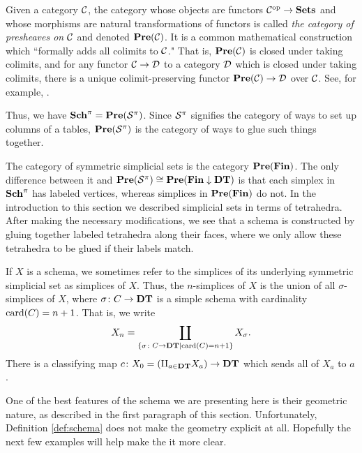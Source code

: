 \documentclass{amsart}
\begin{document}
\begin{remark}\label{rem:sch and fin}

Given a category $\mathcal{C}$, the category whose objects are functors $\mathcal{C}^\textnormal{op}\rightarrow{\bf Sets}$ and whose morphisms are natural transformations of functors is called {\em the category of presheaves on $\mathcal{C}$} and denoted ${\bf Pre}(\mathcal{C})$.  It is a common mathematical construction which ``formally adds all colimits to $\mathcal{C}$."  That is, ${\bf Pre}(\mathcal{C})$ is closed under taking colimits, and for any functor $\mathcal{C}\rightarrow\mathcal{D}$ to a category $\mathcal{D}$ which is closed under taking colimits, there is a unique colimit-preserving functor ${\bf Pre}(\mathcal{C})\rightarrow\mathcal{D}$ over $\mathcal{C}$.  See, for example, \cite[I.5.4]{MM}.

Thus, we have ${\bf Sch}^\pi={\bf Pre}(\mathcal{S}^\pi)$.  Since $\mathcal{S}^\pi$ signifies the category of ways to set up columns of a tables, ${\bf Pre}(\mathcal{S}^\pi)$ is the category of ways to glue such things together.

\end{remark}

\begin{remark}\label{rem:symmetric}

The category of symmetric simplicial sets is the category ${\bf Pre}({\bf Fin})$.  The only difference between it and ${\bf Pre}(\mathcal{S}^\pi)\cong{\bf Pre}({\bf Fin}\downarrow{\bf DT})$ is that each simplex in ${\bf Sch}^\pi$ has labeled vertices, whereas simplices in ${\bf Pre}({\bf Fin})$ do not.  In the introduction to this section we described simplicial sets in terms of tetrahedra.  After making the necessary modifications, we see that a schema is constructed by gluing together labeled tetrahedra along their faces, where we only allow these tetrahedra to be glued if their labels match.

If $X$ is a schema, we sometimes refer to the simplices of its underlying symmetric simplicial set as simplices of $X$.  Thus, the $n$-simplices of $X$ is the union of all $\sigma$-simplices of $X$, where $\sigma\colon C\rightarrow{\bf DT}$ is a simple schema with cardinality $\textnormal{card}(C)=n+1$.  That is, we write $$X_n=\coprod_{\{\sigma\colon C\rightarrow{\bf DT}| \textnormal{card}(C)=n+1\}}X_\sigma.$$  There is a classifying map $c\colon X_0=\left(\amalg_{a\in{\bf DT}}X_a\right)\rightarrow{\bf DT}$ which sends all of $X_a$ to $a$.

\end{remark}

One of the best features of the schema we are presenting here is their geometric nature, as described in the first paragraph of this section.  Unfortunately, Definition \ref{def:schema} does not make the geometry explicit at all.  Hopefully the next few examples will help make the it more clear.
\end{document}
